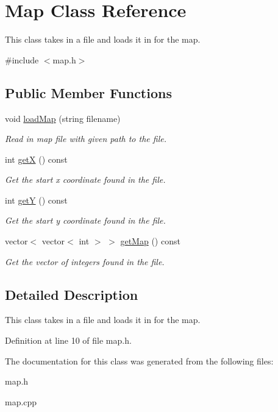 \hypertarget{classMap}{}\section{Map Class Reference}
\label{classMap}


This class takes in a file and loads it in for the map.  




{\ttfamily \#include $<$map.\+h$>$}

\subsection*{Public Member Functions}
\begin{DoxyCompactItemize}
\item 
void \hyperlink{classMap_a51e1c9c777bc6c4171707f1528a73dc6}{load\+Map} (string filename)\hypertarget{classMap_a51e1c9c777bc6c4171707f1528a73dc6}{}\label{classMap_a51e1c9c777bc6c4171707f1528a73dc6}

\begin{DoxyCompactList}\small\item\em Read in map file with given path to the file. \end{DoxyCompactList}\item 
int \hyperlink{classMap_ae235f91105c54961e42e2750cf52deaa}{getX} () const \hypertarget{classMap_ae235f91105c54961e42e2750cf52deaa}{}\label{classMap_ae235f91105c54961e42e2750cf52deaa}

\begin{DoxyCompactList}\small\item\em Get the start x coordinate found in the file. \end{DoxyCompactList}\item 
int \hyperlink{classMap_a7d9858d941f8e40226f4a12d4f8437c4}{getY} () const \hypertarget{classMap_a7d9858d941f8e40226f4a12d4f8437c4}{}\label{classMap_a7d9858d941f8e40226f4a12d4f8437c4}

\begin{DoxyCompactList}\small\item\em Get the start y coordinate found in the file. \end{DoxyCompactList}\item 
vector$<$ vector$<$ int $>$ $>$ \hyperlink{classMap_a84b44f93dc09fc770710b84bf070adfe}{get\+Map} () const \hypertarget{classMap_a84b44f93dc09fc770710b84bf070adfe}{}\label{classMap_a84b44f93dc09fc770710b84bf070adfe}

\begin{DoxyCompactList}\small\item\em Get the vector of integers found in the file. \end{DoxyCompactList}\end{DoxyCompactItemize}


\subsection{Detailed Description}
This class takes in a file and loads it in for the map. 

Definition at line 10 of file map.\+h.



The documentation for this class was generated from the following files\+:\begin{DoxyCompactItemize}
\item 
map.\+h\item 
map.\+cpp\end{DoxyCompactItemize}
